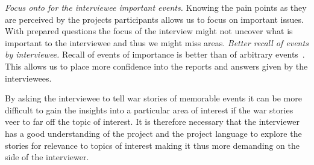 \emph{Focus onto for the interviewee important events.}
Knowing the pain points as they are perceived by the projects participants allows us to focus on important issues.
With prepared questions the focus of the interview might not uncover what is important to the interviewee and thus we might miss areas.
\emph{Better recall of events by interviewee.}
Recall of events of importance is better than of arbitrary events~\cite{lutters:ist:2007}.
This allows us to place more confidence into the reports and answers given by the interviewees.

By asking the interviewee to tell war stories of memorable events it can be more difficult to gain the insights into a particular area of interest if the war stories veer to far off the topic of interest.
It is therefore necessary that the interviewer has a good understanding of the project and the project language to explore the stories for relevance to topics of interest making it thus more demanding on the side of the interviewer.











